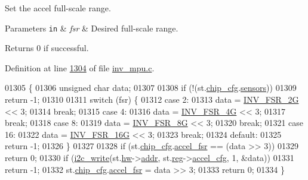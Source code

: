 Set the accel full-\/scale range. 


\begin{DoxyParams}[1]{Parameters}
\mbox{\tt in}  & {\em fsr} & Desired full-\/scale range. \\
\hline
\end{DoxyParams}
\begin{DoxyReturn}{Returns}
0 if successful. 
\end{DoxyReturn}


Definition at line \hyperlink{inv__mpu_8c_source_l01304}{1304} of file \hyperlink{inv__mpu_8c_source}{inv\+\_\+mpu.\+c}.


\begin{DoxyCode}
01305 \{
01306     \textcolor{keywordtype}{unsigned} \textcolor{keywordtype}{char} data;
01307 
01308     \textcolor{keywordflow}{if} (!(st.\hyperlink{structgyro__state__s_ac895217592e2084bd520b0be8e9d20ee}{chip\_cfg}.\hyperlink{structchip__cfg__s_aaa21c01566947e7007476657cb614e3f}{sensors}))
01309         \textcolor{keywordflow}{return} -1;
01310 
01311     \textcolor{keywordflow}{switch} (fsr) \{
01312     \textcolor{keywordflow}{case} 2:
01313         data = \hyperlink{inv__mpu_8c_aec8501b935143099e5f729dee221a81eae27c6f69463dab7de81fac0c51ff8aa7}{INV\_FSR\_2G} << 3;
01314         \textcolor{keywordflow}{break};
01315     \textcolor{keywordflow}{case} 4:
01316         data = \hyperlink{inv__mpu_8c_aec8501b935143099e5f729dee221a81eaa91e3a89d0bbd01149fe71148595be6d}{INV\_FSR\_4G} << 3;
01317         \textcolor{keywordflow}{break};
01318     \textcolor{keywordflow}{case} 8:
01319         data = \hyperlink{inv__mpu_8c_aec8501b935143099e5f729dee221a81ea0a40371bdda397d234c53d0ee2f3be8b}{INV\_FSR\_8G} << 3;
01320         \textcolor{keywordflow}{break};
01321     \textcolor{keywordflow}{case} 16:
01322         data = \hyperlink{inv__mpu_8c_aec8501b935143099e5f729dee221a81ea6712e8563c97c11b458ef721d4f5f9d5}{INV\_FSR\_16G} << 3;
01323         \textcolor{keywordflow}{break};
01324     \textcolor{keywordflow}{default}:
01325         \textcolor{keywordflow}{return} -1;
01326     \}
01327 
01328     \textcolor{keywordflow}{if} (st.\hyperlink{structgyro__state__s_ac895217592e2084bd520b0be8e9d20ee}{chip\_cfg}.\hyperlink{structchip__cfg__s_a97d5de8aa2fab5cc81ca2180130fc6ac}{accel\_fsr} == (data >> 3))
01329         \textcolor{keywordflow}{return} 0;
01330     \textcolor{keywordflow}{if} (\hyperlink{_i2_c_8c_ac0f145afe8d662af199043939f4398d6}{i2c\_write}(st.\hyperlink{structgyro__state__s_a5bac30a96752691e4cc723735060e360}{hw}->\hyperlink{structhw__s_a4c34a946600e9d68b6355d23f54d291b}{addr}, st.\hyperlink{structgyro__state__s_ae857e1285c583b7438a208edd691a38e}{reg}->\hyperlink{structgyro__reg__s_a3e39cea9e122765d4770876d4ce6adc7}{accel\_cfg}, 1, &data))
01331         \textcolor{keywordflow}{return} -1;
01332     st.\hyperlink{structgyro__state__s_ac895217592e2084bd520b0be8e9d20ee}{chip\_cfg}.\hyperlink{structchip__cfg__s_a97d5de8aa2fab5cc81ca2180130fc6ac}{accel\_fsr} = data >> 3;
01333     \textcolor{keywordflow}{return} 0;
01334 \}
\end{DoxyCode}
